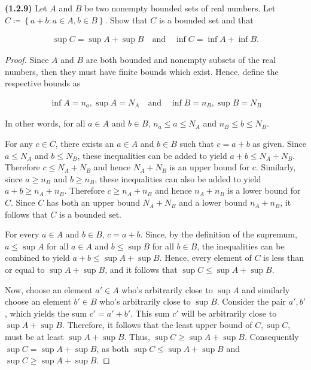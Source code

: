 \documentclass[12pt]{article}
\newcommand{\set}[1]{\left\{ {#1} \right\}}
\begin{document}
\newpage

\noindent \textbf{(1.2.9)} Let $A$ and $B$ be two nonempty bounded sets of real numbers. Let \\ $C \coloneq \set{a+b : a\in A, b\in B}$. Show that $C$ is a bounded set and that

\begin{align*}
	\sup C = \sup A + \sup B \quad \text{and} \quad \inf C = \inf A + \inf B.
\end{align*}

\begin{proof}
	Since $A$ and $B$ are both bounded and nonempty subsets of the real numbers, then they must have finite bounds which exist. Hence, define the respective bounds as 
	
\begin{align*}
	\inf A = n_a, \sup A = N_A \quad\text{and}\quad \inf B = n_B, \sup B = N_B
\end{align*}

\noindent In other words, for all $a\in A$ and $b\in B$, $n_a \le a \le N_A$ and $n_B \le b \le N_B$.

\indent For any $c\in C$, there exists an $a\in A$ and $b\in B$ such that $c=a+b$ as given. Since $a \le N_A$ and $b \le N_B$, these inequalities can be added to yield $a + b \le N_A + N_B$. Therefore $c \le N_A + N_B$ and hence $N_A + N_B$ is an upper bound for c. Similarly, since $a \ge n_B$ and $b \ge n_B$, these inequalities can also be added to yield  $a + b \ge n_A + n_B$. Therefore $c \ge n_A + n_B$ and hence $n_A + n_B$ is a lower bound for $C$. Since $C$ has both an upper bound $N_A + N_B$ and a lower bound $n_A + n_B$, it follows that $C$ is a bounded set.

\indent For every $a\in A$ and $b\in B$, $c=a+b$. Since, by the definition of the supremum, $a\le \sup A$ for all $a\in A$ and $b \le \sup B$ for all $b\in B$, the inequalities can be combined to yield $a+b\le \sup A + \sup B$. Hence, every element of $C$ is less than or equal to $\sup A + \sup B$, and it follows that $\sup C \le \sup A + \sup B$.

\indent Now, choose an element $a'\in A$ who's arbitrarily close to $\sup A$ and similarly choose an element $b'\in B$ who's arbitrarily close to $\sup B$. Consider the pair $a', b'$, which yields the sum $c'=a'+b'$. This sum $c'$ will be arbitrarily close to $\sup A + \sup B$. Therefore, it follows that the least upper bound of $C, \sup C$, must be at least $\sup A+\sup B$. Thus, $\sup C \ge \sup A + \sup B$. Consequently $\sup C = \sup A + \sup B$, as both $\sup C \le \sup A + \sup B$ and $\sup C \ge \sup A + \sup B$.


\end{proof}
\end{document}
